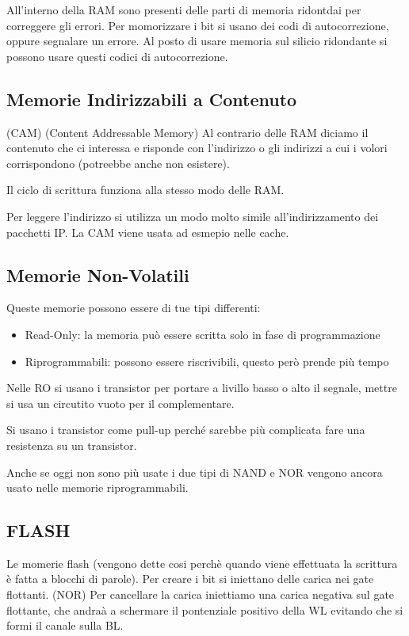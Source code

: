 \documentclass[12pt]{article}
\begin{document}
All'interno della RAM sono presenti delle parti di memoria ridontdai per correggere gli errori. Per momorizzare i bit si usano dei codi di autocorrezione, oppure segnalare un errore. Al posto di usare memoria sul silicio ridondante si possono usare questi codici di autocorrezione. 

\subsection{Memorie Indirizzabili a Contenuto} (CAM) (Content Addressable Memory)
Al contrario delle RAM diciamo il contenuto che ci interessa e risponde con l'indirizzo o gli indirizzi a cui i volori corrispondono (potreebbe anche non esistere).

Il ciclo di scrittura funziona alla stesso modo delle RAM. 

Per leggere l'indirizzo si utilizza un modo molto simile all'indirizzamento dei pacchetti IP. La CAM viene usata ad esmepio nelle cache.

\subsection{Memorie Non-Volatili}
Queste memorie possono essere di tue tipi differenti:
\begin{itemize}
    \item Read-Only: la memoria pu\`o essere scritta solo in fase di programmazione
    \item Riprogrammabili: possono essere riscrivibili, questo per\`o prende pi\`u tempo
\end{itemize}

Nelle RO si usano i transistor per portare a livillo basso o alto il segnale, mettre si usa un circutito vuoto per il complementare.

Si usano i transistor come pull-up perch\'e sarebbe pi\`u complicata fare una resistenza su un transistor.

Anche se oggi non sono pi\`u usate i due tipi di NAND e NOR vengono ancora usato nelle memorie riprogrammabili.



\subsection{FLASH}
Le momerie flash (vengono dette cosi perch\`e quando viene effettuata la scrittura \`e fatta a blocchi di parole). Per creare i bit si iniettano delle carica nei gate flottanti. (NOR) Per cancellare la carica iniettiamo una carica negativa sul gate flottante, che andra\`a a schermare il pontenziale positivo della WL evitando che si formi il canale sulla BL.
\end{document}
